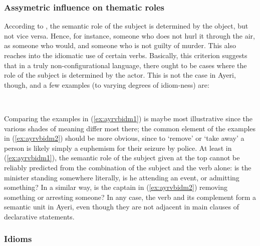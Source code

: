 \subsubsection{Assymetric influence on thematic roles}

According to \citet[129]{speas1990}, the semantic role of the subject is
determined by the object, but not vice versa. Hence, for instance, someone who
 does not hurl it through the air, as someone who
 would, and someone who  is not guilty of
murder. This also reaches into the idiomatic use of certain verbs. Basically,
this criterion suggests that in a truly non-configurational language, there
ought to be cases where the role of the subject is determined by the actor.
This is not the case in Ayeri, though, and a few examples (to varying degrees
of idiom-ness) are:

\pex\label{ex:ayrvbidm1}%
\a {}
\a {}
\a {}
\xe

\pex~\label{ex:ayrvbidm2}%
\a {}
\a {}
\xe

Comparing the examples in (\ref{ex:ayrvbidm1}) is maybe most illustrative since
the various shades of meaning differ most there; the common element of the
examples in (\ref{ex:ayrvbidm2}) should be more obvious, since to `remove' or
`take away' a person is likely simply a euphemism for their seizure by police.
At least in (\ref{ex:ayrvbidm1}), the semantic role of the subject given at the
top cannot be reliably predicted from the combination of the subject and the
verb alone: is the minister standing somewhere literally, is he attending an
event, or admitting something? In a similar way, is the captain in
(\ref{ex:ayrvbidm2}) removing something or arresting someone? In any case, the
verb and its complement form a semantic unit in Ayeri, even though they are not
adjacent in main clauses of declarative statements.

\subsubsection{Idioms}

